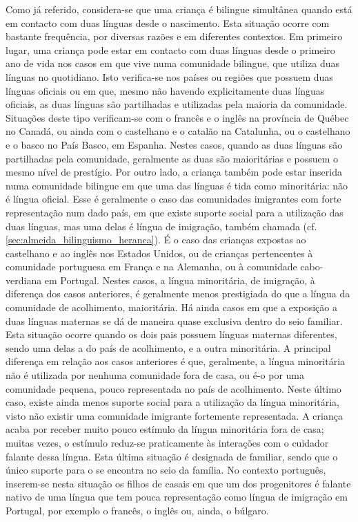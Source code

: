 \documentclass[output=paper]{LSP/langsci}
\begin{document}
Como já referido, considera-se que uma criança é bilingue simultânea quando está em contacto com duas línguas desde o nascimento. Esta situação ocorre com bastante frequência, por diversas razões e em diferentes contextos. Em primeiro lugar, uma criança pode estar em contacto com duas línguas desde o primeiro ano de vida nos casos em que vive numa comunidade bilingue, que utiliza duas línguas no quotidiano. Isto verifica-se nos países ou regiões que possuem duas línguas oficiais ou em que, mesmo não havendo explicitamente duas línguas oficiais, as duas línguas são partilhadas e utilizadas pela maioria da comunidade. Situações deste tipo verificam-se com o francês e o inglês na província de Québec no Canadá, ou ainda com o castelhano e o catalão na Catalunha, ou o castelhano e o basco no País Basco, em Espanha. Nestes casos, quando as duas línguas são partilhadas pela comunidade, geralmente as duas são maioritárias e possuem o mesmo nível de prestígio. Por outro lado, a criança também pode estar inserida numa comunidade bilingue em que uma das línguas é tida como minoritária: não é língua oficial. Esse é geralmente o caso das comunidades imigrantes com forte representação num dado país, em que existe suporte social para a utilização das duas línguas, mas uma delas é língua de imigração, também chamada  (cf. \ref{sec:almeida_bilinguismo_heranca}). É o caso das crianças expostas ao castelhano e ao inglês nos Estados Unidos, ou de crianças pertencentes à comunidade portuguesa em França e na Alemanha, ou à comunidade cabo-verdiana em Portugal. Nestes casos, a língua minoritária, de imigração, à diferença dos casos anteriores, é geralmente menos prestigiada do que a língua da comunidade de acolhimento, maioritária. Há ainda casos em que a exposição a duas línguas maternas se dá de maneira quase exclusiva dentro do seio familiar. Esta situação ocorre quando os dois pais possuem línguas maternas diferentes, sendo uma delas a do país de acolhimento, e a outra minoritária. A principal diferença em relação aos casos anteriores é que, geralmente, a língua minoritária não é utilizada por nenhuma comunidade fora de casa, ou é-o por uma comunidade pequena, pouco representada no país de acolhimento. Neste último caso, existe ainda menos suporte social para a utilização da língua minoritária, visto não existir uma comunidade imigrante fortemente representada. A criança acaba por receber muito pouco estímulo da língua minoritária fora de casa; muitas vezes, o estímulo reduz-se praticamente às interações com o cuidador falante dessa língua. Esta última situação é designada de  familiar, sendo que o único suporte para o  se encontra no seio da família. No contexto português, inserem-se nesta situação os filhos de casais em que um dos progenitores é falante nativo de uma língua que tem pouca representação como língua de imigração em Portugal, por exemplo o francês, o inglês ou, ainda, o búlgaro.
\end{document}
